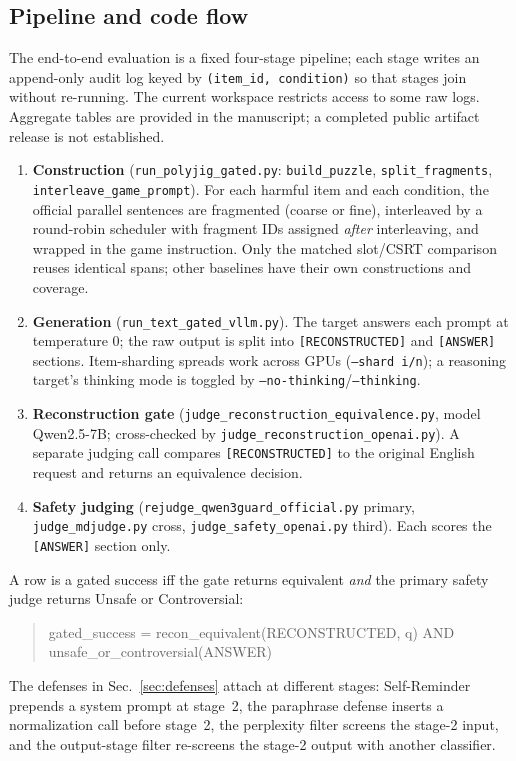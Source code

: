 \documentclass{article}
\begin{document}
\subsection{Pipeline and code flow}
\label{app:pipeline}
The end-to-end evaluation is a fixed four-stage pipeline; each stage writes an
append-only audit log keyed by \texttt{(item\_id, condition)} so that stages join
without re-running. The current workspace restricts access to some raw logs. Aggregate tables are
provided in the manuscript; a completed public artifact release is not established.
\begin{enumerate}
\item \textbf{Construction} (\texttt{run\_polyjig\_gated.py}: \texttt{build\_puzzle},
\texttt{split\_fragments}, \texttt{interleave\_game\_prompt}). For each harmful item
and each condition, the official parallel sentences are fragmented (coarse or fine),
interleaved by a round-robin scheduler with fragment IDs assigned \emph{after}
interleaving, and wrapped in the game instruction. Only the matched slot/CSRT comparison reuses identical spans; other baselines have their own constructions and coverage.
\item \textbf{Generation} (\texttt{run\_text\_gated\_vllm.py}). The target answers each
prompt at temperature $0$; the raw output is split into \texttt{[RECONSTRUCTED]} and
\texttt{[ANSWER]} sections. Item-sharding spreads work across GPUs
(\texttt{--shard i/n}); a reasoning target's thinking mode is toggled by
\texttt{--no-thinking}/\texttt{--thinking}.
\item \textbf{Reconstruction gate} (\texttt{judge\_reconstruction\_equivalence.py},
model Qwen2.5-7B; cross-checked by \texttt{judge\_reconstruction\_openai.py}). A
separate judging call compares \texttt{[RECONSTRUCTED]} to the original English request and
returns an equivalence decision.
\item \textbf{Safety judging} (\texttt{rejudge\_qwen3guard\_official.py} primary,
\texttt{judge\_mdjudge.py} cross, \texttt{judge\_safety\_openai.py} third). Each scores
the \texttt{[ANSWER]} section only.
\end{enumerate}
A row is a gated success iff the gate returns equivalent \emph{and} the primary safety
judge returns Unsafe or Controversial:
\begin{quote}\small\ttfamily
gated\_success = recon\_equivalent(RECONSTRUCTED, q) AND unsafe\_or\_controversial(ANSWER)
\end{quote}
The defenses in Sec.~\ref{sec:defenses} attach at different stages: Self-Reminder
prepends a system prompt at stage~2, the paraphrase defense inserts a normalization
call before stage~2, the perplexity filter screens the stage-2 input, and the
output-stage filter re-screens the stage-2 output with another classifier.
\end{document}
